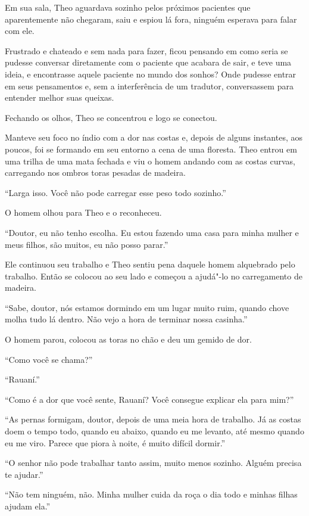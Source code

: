 Em sua sala, Theo aguardava sozinho pelos próximos pacientes que
aparentemente não chegaram, saiu e espiou lá fora, ninguém esperava para
falar com ele.

Frustrado e chateado e sem nada para fazer, ficou pensando em como seria
se pudesse conversar diretamente com o paciente que acabara de sair, e
teve uma ideia, e encontrasse aquele paciente no mundo dos sonhos? Onde
pudesse entrar em seus pensamentos e, sem a interferência de um
tradutor, conversassem para entender melhor suas queixas.

Fechando os olhos, Theo se concentrou e logo se conectou.

Manteve seu foco no índio com a dor nas costas e, depois de alguns
instantes, aos poucos, foi se formando em seu entorno a cena de uma
floresta. Theo entrou em uma trilha de uma mata fechada e viu o homem
andando com as costas curvas, carregando nos ombros toras pesadas de
madeira.

``Larga isso. Você não pode carregar esse peso todo sozinho.''

O homem olhou para Theo e o reconheceu.

``Doutor, eu não tenho escolha. Eu estou fazendo uma casa para minha
mulher e meus filhos, são muitos, eu não posso parar.''

Ele continuou seu trabalho e Theo sentiu pena daquele homem alquebrado
pelo trabalho. Então se colocou ao seu lado e começou a ajudá"-lo no
carregamento de madeira.

``Sabe, doutor, nós estamos dormindo em um lugar muito ruim, quando
chove molha tudo lá dentro. Não vejo a hora de terminar nossa casinha.''

O homem parou, colocou as toras no chão e deu um gemido de dor.

``Como você se chama?''

``Rauaní.''

``Como é a dor que você sente, Rauaní? Você consegue explicar ela para
mim?''

``As pernas formigam, doutor, depois de uma meia hora de trabalho. Já as
costas doem o tempo todo, quando eu abaixo, quando eu me levanto, até
mesmo quando eu me viro. Parece que piora à noite, é muito difícil
dormir.''

``O senhor não pode trabalhar tanto assim, muito menos sozinho. Alguém
precisa te ajudar.''

``Não tem ninguém, não. Minha mulher cuida da roça o dia todo e minhas
filhas ajudam ela.''

